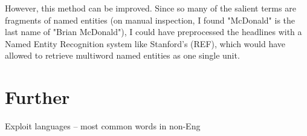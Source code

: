 \documentclass[12pt]{article}%
\begin{document}
However, this method can be improved. Since so many of the salient terms are fragments of named entities (on manual inspection, I found "McDonald" is the last name of "Brian McDonald"), I could have preprocessed the headlines with a Named Entity Recognition system like Stanford's (REF), which would have allowed to retrieve multiword named entities as one single unit. 

\section{Further}

Exploit languages -- most common words in non-Eng


%
%
\end{document}
